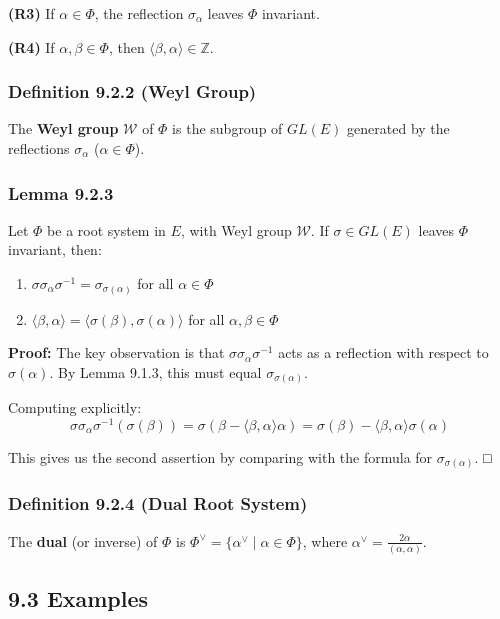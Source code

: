 \textbf{(R3)} If $\alpha \in \Phi$, the reflection $\sigma_\alpha$ leaves $\Phi$ invariant.

\textbf{(R4)} If $\alpha, \beta \in \Phi$, then $\langle\beta, \alpha\rangle \in \mathbb{Z}$.

\subsubsection{Definition 9.2.2 (Weyl Group)}

The \textbf{Weyl group} $\mathcal{W}$ of $\Phi$ is the subgroup of $GL(E)$ generated by the reflections $\sigma_\alpha$ ($\alpha \in \Phi$).

\subsubsection{Lemma 9.2.3}

Let $\Phi$ be a root system in $E$, with Weyl group $\mathcal{W}$. If $\sigma \in GL(E)$ leaves $\Phi$ invariant, then:

\begin{enumerate}
	\item $\sigma \sigma_\alpha \sigma^{-1} = \sigma_{\sigma(\alpha)}$ for all $\alpha \in \Phi$
	\item $\langle\beta, \alpha\rangle = \langle\sigma(\beta), \sigma(\alpha)\rangle$ for all $\alpha, \beta \in \Phi$
\end{enumerate}

\textbf{Proof:}
The key observation is that $\sigma \sigma_\alpha \sigma^{-1}$ acts as a reflection with respect to $\sigma(\alpha)$. By Lemma 9.1.3, this must equal $\sigma_{\sigma(\alpha)}$.

Computing explicitly:
\[
\sigma \sigma_\alpha \sigma^{-1}(\sigma(\beta)) = \sigma(\beta - \langle\beta, \alpha\rangle\alpha) = \sigma(\beta) - \langle\beta, \alpha\rangle\sigma(\alpha)
\]

This gives us the second assertion by comparing with the formula for $\sigma_{\sigma(\alpha)}$. □

\subsubsection{Definition 9.2.4 (Dual Root System)}

The \textbf{dual} (or inverse) of $\Phi$ is $\Phi^\vee = \{\alpha^\vee \mid \alpha \in \Phi\}$, where $\alpha^\vee = \frac{2\alpha}{(\alpha, \alpha)}$.

\subsection{9.3 Examples}

